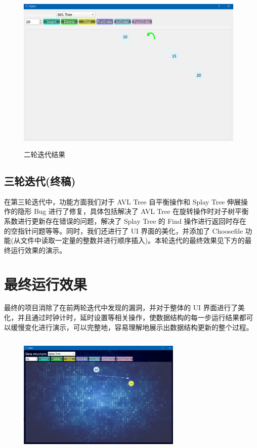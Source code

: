 \documentclass{article}%
\begin{document}
\begin{figure}[htbp]
	\centering
	\includegraphics[height=8.0cm,width=12.0cm]{./image/9.png}
	\caption{二轮迭代结果}
\end{figure}	
	
\subsection{三轮迭代(终稿)}
	\par 在第三轮迭代中，功能方面我们对于 AVL Tree 自平衡操作和 Splay Tree 伸展操作的隐形 Bug 进行了修复，具体包括解决了 AVL Tree 在旋转操作时对子树平衡系数进行更新存在错误的问题，解决了 Splay Tree 的 Find 操作进行返回时存在的空指针问题等等。同时，我们还进行了 UI 界面的美化，并添加了 Choosefile 功能(从文件中读取一定量的整数并进行顺序插入)。本轮迭代的最终效果见下方的最终运行效果的演示。
\section{最终运行效果}
	\par 最终的项目消除了在前两轮迭代中发现的漏洞，并对于整体的 UI 界面进行了美化，并且通过时钟计时，延时设置等相关操作，使数据结构的每一步运行结果都可以缓慢变化进行演示，可以完整地，容易理解地展示出数据结构更新的整个过程。

\begin{figure}[htbp]
	\centering
	\includegraphics[height=6.0cm,width=8.0cm]{./image/1.png}
\end{figure}
\end{document}
